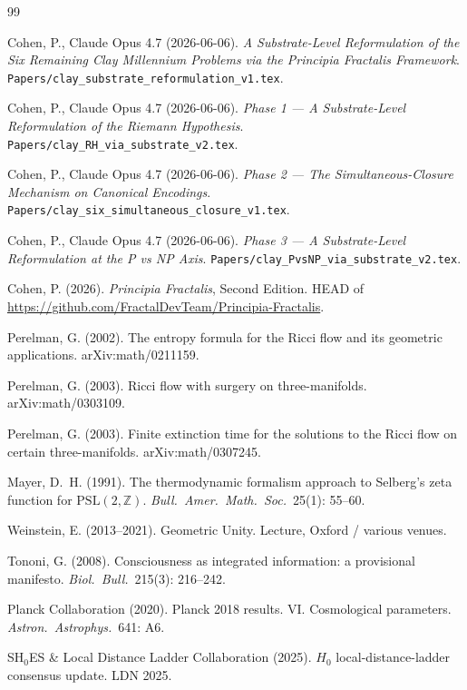 \documentclass[11pt,a4paper]{article}
\theoremstyle{plain}
\theoremstyle{definition}
\begin{document}
\begin{thebibliography}{99}

Cohen, P., Claude Opus 4.7 (2026-06-06). \emph{A Substrate-Level
Reformulation of the Six Remaining Clay Millennium Problems via the
Principia Fractalis Framework}.
\texttt{Papers/clay\_substrate\_reformulation\_v1.tex}.

Cohen, P., Claude Opus 4.7 (2026-06-06). \emph{Phase 1 ---
A Substrate-Level Reformulation of the Riemann Hypothesis}.
\texttt{Papers/clay\_RH\_via\_substrate\_v2.tex}.

Cohen, P., Claude Opus 4.7 (2026-06-06). \emph{Phase 2 ---
The Simultaneous-Closure Mechanism on Canonical Encodings}.
\texttt{Papers/clay\_six\_simultaneous\_closure\_v1.tex}.

Cohen, P., Claude Opus 4.7 (2026-06-06). \emph{Phase 3 ---
A Substrate-Level Reformulation at the P vs NP Axis}.
\texttt{Papers/clay\_PvsNP\_via\_substrate\_v2.tex}.

Cohen, P. (2026). \emph{Principia Fractalis}, Second Edition.
HEAD of
\url{https://github.com/FractalDevTeam/Principia-Fractalis}.

Perelman, G. (2002). The entropy formula for the Ricci flow and its
geometric applications. arXiv:math/0211159.

Perelman, G. (2003). Ricci flow with surgery on three-manifolds.
arXiv:math/0303109.

Perelman, G. (2003). Finite extinction time for the solutions to the
Ricci flow on certain three-manifolds. arXiv:math/0307245.

Mayer, D.~H. (1991). The thermodynamic formalism approach to
Selberg's zeta function for $\mathrm{PSL}(2, \mathbb{Z})$.
\emph{Bull.\ Amer.\ Math.\ Soc.}\ 25(1): 55--60.

Weinstein, E. (2013--2021). Geometric Unity. Lecture, Oxford /
various venues.

Tononi, G. (2008). Consciousness as integrated information: a
provisional manifesto. \emph{Biol.\ Bull.}\ 215(3): 216--242.

Planck Collaboration (2020). Planck 2018 results. VI. Cosmological
parameters. \emph{Astron.\ Astrophys.}\ 641: A6.

SH$_{0}$ES \& Local Distance Ladder Collaboration (2025). $H_{0}$
local-distance-ladder consensus update. LDN 2025.


\end{thebibliography}
\end{document}

